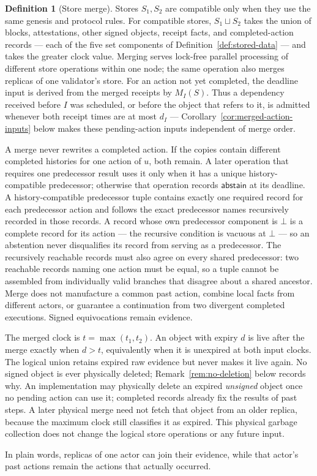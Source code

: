 \ifx\litemode\undefined\documentclass{article}\fi
\theoremstyle{plain}
\theoremstyle{definition}
\newtheorem{definition}{Definition}
\theoremstyle{remark}
\begin{document}
\begin{definition}[Store merge]\label{def:store-join}
Stores \(S_1,S_2\) are compatible only when they use the same genesis and
protocol rules.  For compatible stores, \(S_1\sqcup S_2\) takes the union of
blocks, attestations, other signed objects, receipt facts, and
completed-action records --- each of the five set components of
Definition~\ref{def:stored-data} --- and takes
the greater clock value.  Merging serves lock-free parallel processing of
different store operations within one node; the same operation also merges
replicas of one validator's store.  For an action not yet completed,
the deadline input is derived from the merged receipts by \(M_I(S)\).
Thus a dependency received before \(I\) was scheduled, or before the object
that refers to it, is admitted whenever both receipt times are at most
\(d_I\) --- Corollary~\ref{cor:merged-action-inputs} below makes these
pending-action inputs independent of merge order.

A merge never rewrites a completed action.  If the copies contain different
completed histories for one action of \(u\), both remain.  A later operation that
requires one predecessor result uses it only when it has a unique
history-compatible predecessor; otherwise that operation records
\(\mathsf{abstain}\) at its deadline.  A history-compatible predecessor tuple
contains exactly one required record for each predecessor action and follows
the exact predecessor names recursively recorded in those records.  A
record whose own predecessor component is \(\bot\) is a complete
record for its action --- the recursive condition is vacuous at
\(\bot\) --- so an abstention never disqualifies its record from
serving as a predecessor.  The recursively reachable records must also
agree on every shared predecessor: two reachable records naming one
action must be equal, so a tuple cannot be assembled from individually
valid branches that disagree about a shared ancestor.  Merge
does not manufacture a common past action,
combine local facts from different actors, or guarantee a continuation from
two divergent completed executions.  Signed equivocations remain evidence.

The merged clock is \(t=\max(t_1,t_2)\).  An object with expiry \(d\) is live
after the merge exactly when \(d>t\), equivalently when it is unexpired at
both input clocks.  The logical union retains expired raw evidence but never
makes it live again.  No signed object is ever physically deleted;
Remark~\ref{rem:no-deletion} below records why.
An implementation may
physically delete an expired \emph{unsigned} object once no pending
action can use it; completed records already fix
the results of past steps.  A later physical merge need not fetch that object
from an older replica, because the maximum clock still classifies it as
expired.  This physical garbage collection does not change the logical store
operations or any future input.

In plain words, replicas of one actor can join their evidence, while that
actor's past actions remain the actions that actually occurred.
\end{definition}
\end{document}
